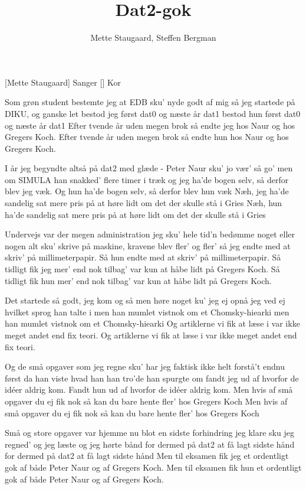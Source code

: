 \documentclass[a4paper,11pt]{article}
\title{Dat2-gok}
\author{Mette Staugaard, Steffen Bergman}
\begin{document}
\maketitle

\begin{roles}
[Mette Staugaard] Sanger
[] Kor
\end{roles}

\begin{song}
Som grøn student bestemte jeg
at EDB sku' nyde godt af mig
så jeg startede på DIKU, og ganske let
bestod jeg først dat0 og næste år dat1
 bestod hun først dat0 og næste år dat1
 Efter tvende år uden megen brok
så endte jeg hos Naur og hos Gregers Koch.
 Efter tvende år uden megen brok
så endte hun hos Naur og hos Gregers Koch.

I år jeg begyndte altså på dat2
med glæde - Peter Naur sku' jo vær' så go'
men om SIMULA han snakked' flere timer i træk
og jeg ha'de bogen selv, så derfor blev jeg væk.
 Og hun ha'de bogen selv, så derfor blev hun væk
 Næh, jeg ha'de sandelig sat mere pris
på at høre lidt om det der skulle stå i Gries
 Næh, hun ha'de sandelig sat mere pris
på at høre lidt om det der skulle stå i Gries

Undervejs var der megen administration
jeg sku' hele tid'n bedømme noget eller nogen
alt sku' skrive på maskine, kravene blev fler' og fler'
så jeg endte med at skriv' på millimeterpapir.
 Så hun endte med at skriv' på millimeterpapir.
 Så tidligt fik jeg mer' end nok
tilbag' var kun at håbe lidt på Gregers Koch.
Så tidligt fik hun mer' end nok
tilbag' var kun at håbe lidt på Gregers Koch.

Det startede så godt, jeg kom og så
men høre noget ku' jeg ej opnå
jeg ved ej hvilket sprog han talte i
men han mumlet vistnok om et Chomsky-hiearki
 men han mumlet vistnok om et Chomsky-hiearki
 Og artiklerne vi fik at læse i
var ikke meget andet end fix teori.
 Og artiklerne vi fik at læse i
var ikke meget andet end fix teori.

Og de små opgaver som jeg regne sku'
har jeg faktisk ikke helt forstå't endnu
først da han viste hvad han han tro'de han spurgte om
fandt jeg ud af hvorfor de idéer aldrig kom.
 Fandt hun ud af hvorfor de idéer aldrig kom.
 Men hvis af små opgaver du ej fik nok
så kan du bare hente fler' hos Gregers Koch
 Men hvis af små opgaver du ej fik nok
så kan du bare hente fler' hos Gregers Koch

Små og store opgaver var hjemme nu
blot en sidste forhindring jeg klare sku
jeg regned' og jeg læste og jeg hørte bånd
for dermed på dat2 at få lagt sidste hånd
 for dermed på dat2 at få lagt sidste hånd
 Men til eksamen fik jeg et ordentligt gok
af både Peter Naur og af Gregers Koch.
 Men til eksamen fik hun et ordentligt gok
af både Peter Naur og af Gregers Koch.
\end{song}
\end{document}
